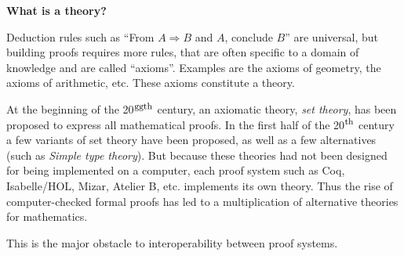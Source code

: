 \begin{framed}
\vspace*{-0.5cm}
  \begin{center}
{\bf \Large What is a theory?}
\end{center}

Deduction rules such as ``From $A \Rightarrow B$ and $A$, conclude
$B$'' are universal, but building proofs requires more rules, that are
often specific to a domain of knowledge and are called
``axioms''. Examples are the axioms of geometry, the axioms of
arithmetic, etc. These axioms constitute a theory.

At the beginning of the 20$^{\mbox{\footnotesize ggth}}$ century, an
axiomatic theory, {\em set theory}, has been proposed to express all
mathematical proofs. In the first half of the 20$^{\mbox{\footnotesize
    th}}$ century a few variants of set theory have been proposed, as
well as a few alternatives (such as \emph{Simple type theory}).  But
because these theories had not been designed for being implemented on
a computer, each proof system such as Coq, Isabelle/HOL, Mizar,
Atelier B, etc. implements its own theory.  Thus the rise of
computer-checked formal proofs has led to a multiplication of
alternative theories for mathematics.

This is the major obstacle to interoperability between proof systems.
\end{framed}
\pagebreak

